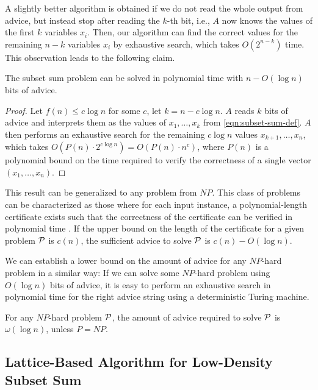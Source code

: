 A slightly better algorithm is obtained if we do not read the whole output
from advice, but instead stop after reading the $k$-th bit, i.e., $A$ now
knows the values of the first $k$ variables $x_i$. Then, our algorithm can
find the correct values for the remaining $n-k$ variables $x_i$ by
exhaustive search, which takes $O(2^{n-k})$ time. This observation leads
to the following claim.

\begin{theorem}\label{theorem:subset-sum-advice-upper}
    The subset sum problem can be solved in polynomial time with
    $n-O(\log{}n)$ bits of advice.
\end{theorem}

\begin{proof}
    Let $f(n) \leq c\log{}n$ for some $c$, let $k = n - c \log{}n$. $A$
    reads $k$ bits of advice and interprets them as the values of $x_1,
    \dots, x_k$ from \eqref{eqn:subset-sum-def}. $A$ then performs an
    exhaustive search for the remaining $c \log{}n$ values $x_{k+1},
    \dots, x_{n}$, which takes $O(P(n) \cdot 2^{c\log{}n}) = O(P(n) \cdot
    n^c)$, where $P(n)$ is a polynomial bound on the time required to
    verify the correctness of a single vector $(x_1, \dots, x_n)$.
\end{proof}

This result can be generalized to any problem from $NP$. This class of
problems can be characterized as those where for each input instance, a
polynomial-length certificate exists such that the correctness of the
certificate can be verified in polynomial time \cite{introduction}.  If
the upper bound on the length of the certificate for a given problem
$\mathcal{P}$ is $c(n)$, the sufficient advice to solve
$\mathcal{P}$ is $c(n) - O(\log{}n)$.

We can establish a lower bound on the amount of advice for any $NP$-hard
problem in a similar way: If we can solve some $NP$-hard problem using
$O(\log{}n)$ bits of advice, it is easy to perform an exhaustive search in
polynomial time for the right advice string using a deterministic Turing
machine.

\begin{theorem}\label{theorem:np-hard-advice-lower}
    For any $NP$-hard problem $\mathcal{P}$, the amount of advice
    required to solve $\mathcal{P}$ is $\omega(\log{}n)$, unless
    $P=NP$.
\end{theorem}

\subsection{Lattice-Based Algorithm for Low-Density Subset Sum}
\label{section:lattice-based}


